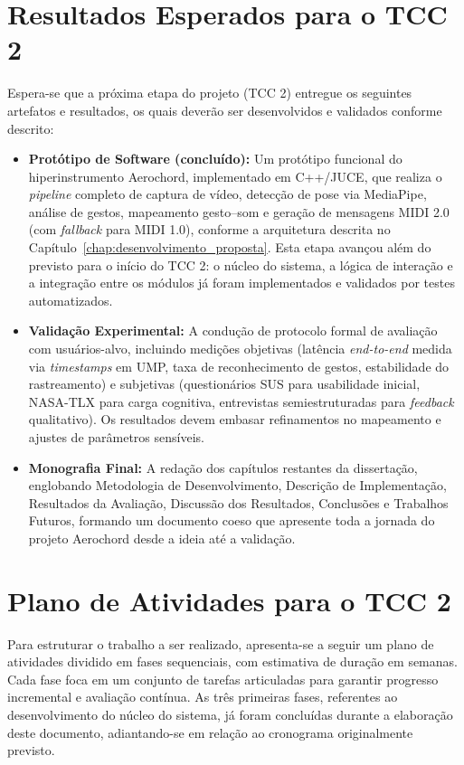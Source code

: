 \section{Resultados Esperados para o TCC 2}
\label{sec:resultados_esperados_tcc2}

Espera-se que a próxima etapa do projeto (TCC 2) entregue os seguintes artefatos e resultados, os quais deverão ser desenvolvidos e validados conforme descrito:

\begin{itemize}
    \item \textbf{Protótipo de Software (concluído):} Um protótipo funcional do hiperinstrumento Aerochord, implementado em C++/JUCE, que realiza o \textit{pipeline} completo de captura de vídeo, detecção de pose via MediaPipe, análise de gestos, mapeamento gesto–som e geração de mensagens MIDI 2.0 (com \textit{fallback} para MIDI 1.0), conforme a arquitetura descrita no Capítulo~\ref{chap:desenvolvimento_proposta}. Esta etapa avançou além do previsto para o início do TCC 2: o núcleo do sistema, a lógica de interação e a integração entre os módulos já foram implementados e validados por testes automatizados.
    \item \textbf{Validação Experimental:} A condução de protocolo formal de avaliação com usuários-alvo, incluindo medições objetivas (latência \textit{end-to-end} medida via \textit{timestamps} em UMP, taxa de reconhecimento de gestos, estabilidade do rastreamento) e subjetivas (questionários SUS para usabilidade inicial, NASA-TLX para carga cognitiva, entrevistas semiestruturadas para \textit{feedback} qualitativo). Os resultados devem embasar refinamentos no mapeamento e ajustes de parâmetros sensíveis.
    \item \textbf{Monografia Final:} A redação dos capítulos restantes da dissertação, englobando Metodologia de Desenvolvimento, Descrição de Implementação, Resultados da Avaliação, Discussão dos Resultados, Conclusões e Trabalhos Futuros, formando um documento coeso que apresente toda a jornada do projeto Aerochord desde a ideia até a validação.
\end{itemize}

\section{Plano de Atividades para o TCC 2}
\label{sec:plano_atividades_tcc2}

Para estruturar o trabalho a ser realizado, apresenta-se a seguir um plano de atividades dividido em fases sequenciais, com estimativa de duração em semanas. Cada fase foca em um conjunto de tarefas articuladas para garantir progresso incremental e avaliação contínua. As três primeiras fases, referentes ao desenvolvimento do núcleo do sistema, já foram concluídas durante a elaboração deste documento, adiantando-se em relação ao cronograma originalmente previsto.

